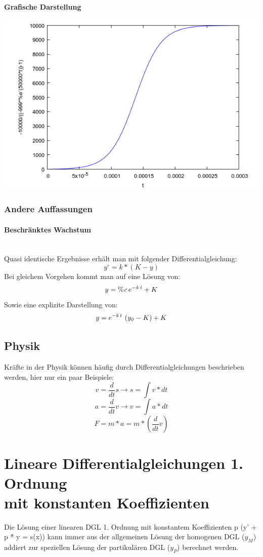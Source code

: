 \documentclass[a4paper,12pt]{article}
\begin{document}
\newpage

\begin{flushleft}
 \textbf{Grafische Darstellung}
\end{flushleft}
\includegraphics[scale=0.6]{logistisches-wachstum.png}

\subsubsection{Andere Auffassungen}
\paragraph{Beschr\"anktes Wachstum}~\\
Quasi identische Ergebnisse erh\"alt man mit folgender Differentialgleichung:
$$y^\circ = k*(K - y)$$
Bei gleichem Vorgehen kommt man auf eine L\"osung von:
$$y={\it \%c}\,e^ {- {k\,t} }+K$$
Sowie eine explizite Darstellung von:
$$y=e^ {- {k\,t} }\,\left({\it y_0}-K\right)+K$$

\newpage

\subsection{Physik}
Kräfte in der Physik können häufig durch Differentialgleichungen beschrieben werden, hier nur ein paar Beispiele:
\[v=\frac{d}{dt}s \to s = \int v * dt\]
\[a=\frac{d}{dt}v \to v = \int a * dt\]
\[F = m*a = m*\left( \frac{d}{dt}v\right) \]

\newpage

\section[Lineare DGL 1. Ordnung mit konstanten Koeffizienten]{Lineare Differentialgleichungen 1. Ordnung\\ mit konstanten Koeffizienten}
Die Lösung einer linearen DGL 1. Ordnung mit konstantem Koeffizienten p (y' + p * y = s(x)) kann immer aus der allgemeinen Lösung der homogenen DGL ($y_M$) addiert zur speziellen L\"osung der partikul\"aren DGL ($y_P$) berechnet werden.
\end{document}
